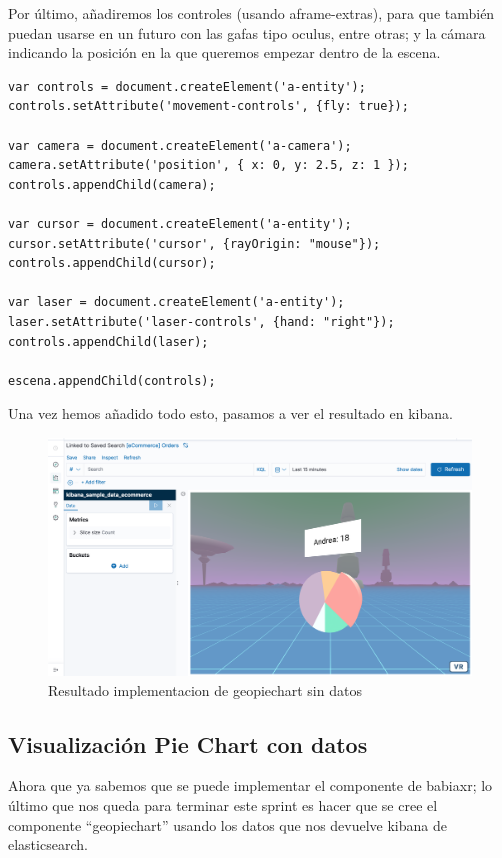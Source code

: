 \documentclass[a4paper, 12pt]{book}
\begin{document}
Por último, añadiremos los controles (usando aframe-extras), para que también puedan usarse en un futuro con las gafas tipo oculus, entre otras; y la cámara indicando la posición en la que queremos empezar dentro de la escena.

\begin{lstlisting}[frame=single]
var controls = document.createElement('a-entity');
controls.setAttribute('movement-controls', {fly: true});

var camera = document.createElement('a-camera');
camera.setAttribute('position', { x: 0, y: 2.5, z: 1 });
controls.appendChild(camera);

var cursor = document.createElement('a-entity');
cursor.setAttribute('cursor', {rayOrigin: "mouse"});
controls.appendChild(cursor);

var laser = document.createElement('a-entity');
laser.setAttribute('laser-controls', {hand: "right"});
controls.appendChild(laser);

escena.appendChild(controls);
\end{lstlisting}

Una vez hemos añadido todo esto, pasamos a ver el resultado en kibana.

\begin{figure}[H]
  \centering
  \includegraphics[width=12cm, keepaspectratio]{img/development/pie-sin-data.png}
  \caption{Resultado implementacion de geopiechart sin datos}
  \label{fig:piesindata}
\end{figure}

\subsection{Visualización Pie Chart con datos}

Ahora que ya sabemos que se puede implementar el componente de babiaxr; lo último que nos queda para terminar este sprint es hacer que se cree el componente “geopiechart” usando los datos que nos devuelve kibana de elasticsearch.
\end{document}

